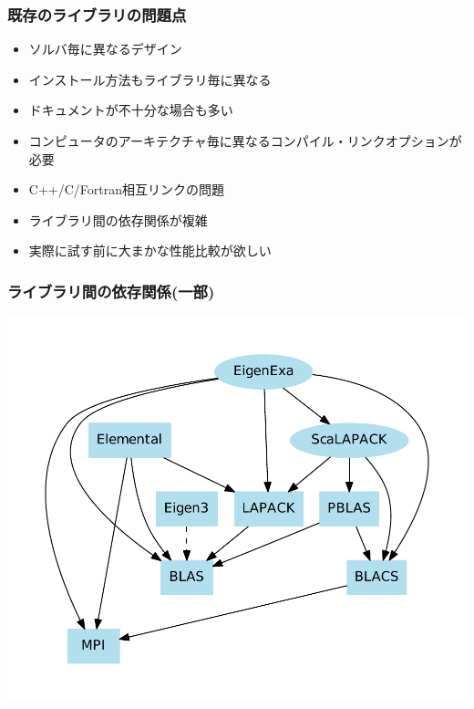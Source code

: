\begin{frame}
  \frametitle{既存のライブラリの問題点}
  \begin{itemize}
    \setlength{\itemsep}{1em}
  \item ソルバ毎に異なるデザイン
  \item インストール方法もライブラリ毎に異なる
  \item ドキュメントが不十分な場合も多い
  \item コンピュータのアーキテクチャ毎に異なるコンパイル・リンクオプションが必要
  \item C++/C/Fortran相互リンクの問題
  \item ライブラリ間の依存関係が複雑
  \item 実際に試す前に大まかな性能比較が欲しい
  \end{itemize}
\end{frame}

\begin{frame}
  \frametitle{ライブラリ間の依存関係(一部)}
  \begin{center}
    \includegraphics[height=0.8\textheight]{figure/library-dependence.pdf}
  \end{center}
\end{frame}

